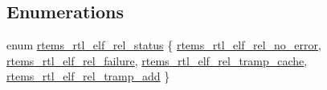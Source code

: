 \subsection*{Enumerations}
\begin{DoxyCompactItemize}
\item 
enum \mbox{\hyperlink{rtl-elf_8h_a97d7ca039fc1123f4ca0c7b43d4a811f}{rtems\+\_\+rtl\+\_\+elf\+\_\+rel\+\_\+status}} \{ \mbox{\hyperlink{rtl-elf_8h_a97d7ca039fc1123f4ca0c7b43d4a811fa2e578378c9509e77a7033bf59867e923}{rtems\+\_\+rtl\+\_\+elf\+\_\+rel\+\_\+no\+\_\+error}}, 
\mbox{\hyperlink{rtl-elf_8h_a97d7ca039fc1123f4ca0c7b43d4a811fa418964a793815a53611cd673757698a5}{rtems\+\_\+rtl\+\_\+elf\+\_\+rel\+\_\+failure}}, 
\mbox{\hyperlink{rtl-elf_8h_a97d7ca039fc1123f4ca0c7b43d4a811fa6fef7f5943ab9a14c3a24d4530f6a3cd}{rtems\+\_\+rtl\+\_\+elf\+\_\+rel\+\_\+tramp\+\_\+cache}}, 
\mbox{\hyperlink{rtl-elf_8h_a97d7ca039fc1123f4ca0c7b43d4a811fa85ffe1347d9eb4a2b203d769cdb2c358}{rtems\+\_\+rtl\+\_\+elf\+\_\+rel\+\_\+tramp\+\_\+add}}
 \}
\end{DoxyCompactItemize}
